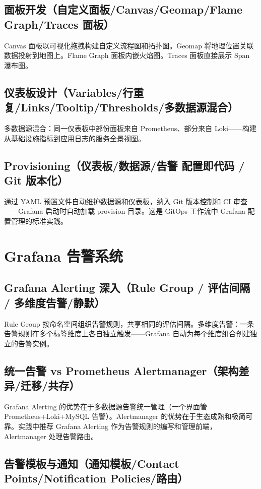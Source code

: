 \documentclass[12pt,UTF8]{ctexbook}
\begin{document}
    \subsection{面板开发（自定义面板/Canvas/Geomap/Flame Graph/Traces 面板）}

Canvas 面板以可视化拖拽构建自定义流程图和拓扑图。Geomap 将地理位置关联数据投射到地图上。Flame Graph 面板内嵌火焰图。Traces 面板直接展示 Span 瀑布图。

    \subsection{仪表板设计（Variables/行重复/Links/Tooltip/Thresholds/多数据源混合）}

多数据源混合：同一仪表板中部份面板来自 Prometheus、部分来自 Loki——构建从基础设施指标到应用日志的服务全景视图。

    \subsection{Provisioning（仪表板/数据源/告警 配置即代码 / Git 版本化）}

通过 YAML 预置文件自动维护数据源和仪表板，纳入 Git 版本控制和 CI 审查——Grafana 启动时自动加载 provision 目录。这是 GitOps 工作流中 Grafana 配置管理的标准实践。

  \section{Grafana 告警系统}
    \subsection{Grafana Alerting 深入（Rule Group / 评估间隔 / 多维度告警/静默）}

Rule Group 按命名空间组织告警规则，共享相同的评估间隔。多维度告警：一条告警规则在多个标签维度上各自独立触发——Grafana 自动为每个维度组合创建独立的告警实例。

    \subsection{统一告警 vs Prometheus Alertmanager（架构差异/迁移/共存）}

Grafana Alerting 的优势在于多数据源告警统一管理（一个界面管 Prometheus+Loki+MySQL 告警）。Alertmanager 的优势在于生态成熟和极简可靠。实践中推荐 Grafana Alerting 作为告警规则的编写和管理前端，Alertmanager 处理告警路由。

    \subsection{告警模板与通知（通知模板/Contact Points/Notification Policies/路由）}
\end{document}
